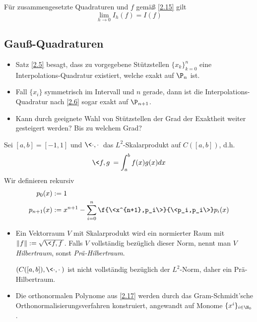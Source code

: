 \documentclass[11pt]{scrartcl}
\begin{document}
\begin{kor}[Konvergenz]
	\label{2.16}
	Für zusammengesetzte Quadraturen und $f$ gemäß \ref{2.15} gilt
	\[
		\lim_{h \to 0} I_h(f) = I(f)
	\]
\end{kor}

\subsection{Gauß-Quadraturen}

\begin{itemize}
	\item
		Satz \ref{2.5} besagt, dass zu vorgegebene Stützstellen $\{x_k\}_{k=0}^n$ eine Interpolations-Quadratur existiert, welche exakt auf $\P_n$ ist.
	\item
		Fall $\{x_i\}$ symmetrisch im Intervall und $n$ gerade, dann ist die Interpolations-Quadratur nach \ref{2.6} sogar exakt auf $\P_{n+1}$.
	\item
		Kann durch geeignete Wahl von Stützstellen der Grad der Exaktheit weiter gesteigert werden? Bis zu welchem Grad?
\end{itemize}

\begin{df}
	\label{2.17}	
	Sei $[a,b] = [-1,1]$ und $\<\cdot, \cdot\>$ das $L^2$-Skalarprodukt auf $C([a,b])$, d.h.
	\[
		\<f,g\> = \int_a^b f(x)g(x) dx
	\]
	Wir definieren rekursiv
	\begin{align*}
		p_0(x) &:= 1 \\
		p_{n+1}(x) &:= x^{n+1}- \sum_{i=0}^n \f {\<x^{n+1},p_i\>}{\<p_i,p_i\>} p_i(x)
	\end{align*}
	\begin{note}
		\begin{itemize}
			\item
				Ein Vektorraum $V$ mit Skalarprodukt wird ein normierter Raum mit $\|f\| := \sqrt{\<f,f\>}$.
				Falls $V$ vollständig bezüglich dieser Norm, nennt man $V$ \emph{Hilbertraum}, sonst \emph{Prä-Hilbertraum}.

				$(C([a,b]),\<\cdot,\cdot\>)$ ist nicht vollständig bezüglich der $L^2$-Norm, daher ein Prä-Hilbertraum.
			\item
				Die orthonormalen Polynome aus \ref{2.17} werden durch das Gram-Schmidt'sche Orthonormalisierungsverfahren konstruiert, angewandt auf Monome $\{x^i\}_{i\in \N_0}$.

		\end{itemize}
	\end{note}
\end{df}
\end{document}
